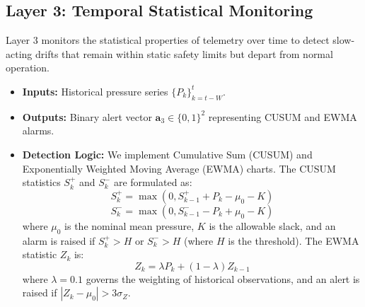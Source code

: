 \documentclass[journal,twoside,web]{ieeecolor}
\begin{document}
\subsection{Layer 3: Temporal Statistical Monitoring}
Layer 3 monitors the statistical properties of telemetry over time to detect slow-acting drifts that remain within static safety limits but depart from normal operation.
\begin{itemize}
    \item \textbf{Inputs:} Historical pressure series $\{P_k\}_{k=t-W}^t$.
    \item \textbf{Outputs:} Binary alert vector $\bm{a}_3 \in \{0,1\}^2$ representing CUSUM and EWMA alarms.
    \item \textbf{Detection Logic:} We implement Cumulative Sum (CUSUM) and Exponentially Weighted Moving Average (EWMA) charts. The CUSUM statistics $S_k^+$ and $S_k^-$ are formulated as:
    \begin{equation}
    S_k^+ = \max\left(0, S_{k-1}^+ + P_k - \mu_0 - K\right)
    \end{equation}
    \begin{equation}
    S_k^- = \max\left(0, S_{k-1}^- - P_k + \mu_0 - K\right)
    \end{equation}
    where $\mu_0$ is the nominal mean pressure, $K$ is the allowable slack, and an alarm is raised if $S_k^+ > H$ or $S_k^- > H$ (where $H$ is the threshold). The EWMA statistic $Z_k$ is:
    \begin{equation}
    Z_k = \lambda P_k + (1-\lambda) Z_{k-1}
    \end{equation}
    where $\lambda = 0.1$ governs the weighting of historical observations, and an alert is raised if $|Z_k - \mu_0| > 3\sigma_{Z}$.
\end{itemize}
\end{document}
